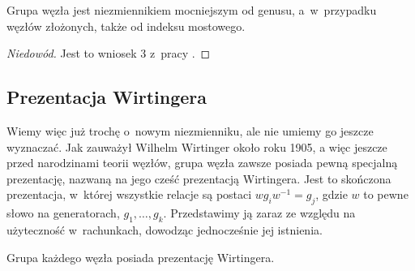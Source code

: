 \begin{proposition}
    Grupa węzła jest niezmiennikiem mocniejszym od genusu, a~w~przypadku węzłów złożonych, także od indeksu mostowego.
\end{proposition}

\begin{proof}[Niedowód]
    Jest to wniosek 3 z~pracy \cite{feustel78}.
\end{proof}

\subsection{Prezentacja Wirtingera}
Wiemy więc już trochę o~nowym niezmienniku, ale nie umiemy go jeszcze wyznaczać.
Jak zauważył Wilhelm Wirtinger około roku 1905, a więc jeszcze przed narodzinami teorii węzłów, grupa węzła zawsze posiada pewną specjalną prezentację, nazwaną na jego cześć prezentacją Wirtingera.
Jest to skończona prezentacja, w~której wszystkie relacje są postaci $w g_i w^{-1} = g_j$, gdzie $w$ to pewne słowo na generatorach, $g_1, \ldots, g_k$.
Przedstawimy ją zaraz ze względu na użyteczność w~rachunkach, dowodząc jednocześnie jej istnienia.

\begin{proposition}
    \label{prop:wirtinger}
    Grupa każdego węzła posiada prezentację Wirtingera.
\end{proposition}


